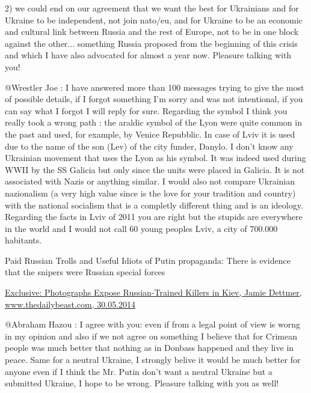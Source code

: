 \begin{itemize}
\begin{itemize}
2) we could end on our agreement that we want the best for Ukrainians and for
Ukraine to be independent, not join nato/eu, and for Ukraine to be an economic
and cultural link between Russia and the rest of Europe, not to be in one block
against the other... something Russia proposed from the beginning of this
crisis and which I have also advocated for almost a year now. Pleasure talking
with you!


@Wrestler Joe : I have answered more than 100 messages trying to give the most
of possible details, if I forgot something I'm sorry and was not intentional,
if you can say what I forgot I will reply for sure. Regarding the symbol I
think you really took a wrong path : the araldic symbol of the Lyon were quite
common in the past and used, for example, by Venice Repubblic. In case of Lviv
it is used due to the name of the son (Lev) of the city funder, Danylo. I don't
know any Ukrainian movement that uses the Lyon as his symbol. It was indeed
used during WWII by the SS Galicia but only since the units were placed in
Galicia. It is not associated with Nazis or anything similar. I would also not
compare Ukrainian nazionalism (a very high value since is the love for your
tradition and country) with the national socialism that is a completly
different thing and is an ideology. Regarding the facts in Lviv of 2011 you are
right but the stupids are everywhere in the world and I would not call 60 young
peoples Lviv, a city of 700.000 habitants.


Paid Russian Trolls and Useful Idiots of Putin propaganda: There is evidence
that the snipers were Russian special forces

\href{https://www.thedailybeast.com/exclusive-photographs-expose-russian-trained-killers-in-kiev}{%
Exclusive: Photographs Expose Russian-Trained Killers in Kiev, Jamie Dettmer, www.thedailybeast.com, 30.05.2014%
}


@Abraham Hazou : I agree with you: even if from a legal point of view is worng
in my opinion and also if we not agree on something I believe that for Crimean
people was much better that nothing as in Donbass happened and they live in
peace. Same for a neutral Ukraine, I strongly belive it would be much better
for anyone even if I think the Mr. Putin don't want a neutral Ukraine but a
submitted Ukraine, I hope to be wrong. Pleasure talking with you as well!



\end{itemize}
\end{itemize}
